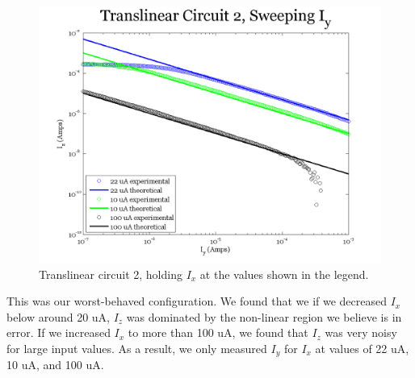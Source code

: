 \documentclass{article}
\begin{document}
\begin{figure}[H]
\begin{center}
\includegraphics[scale=.75]{exp3_sweepy.png}
\caption{Translinear circuit 2, holding $I_x$ at the values shown in the legend.}
\label{fig:tl2sweepy}
\end{center}
\end{figure}

This was our worst-behaved configuration.  We found that we if we decreased $I_x$ below around 20 uA, $I_z$ was dominated by the non-linear region we believe is in error.  If we increased $I_x$ to more than 100 uA, we found that $I_z$ was very noisy for large input values.  As a result, we only measured $I_y$ for $I_x$ at values of 22 uA, 10 uA, and 100 uA.
\end{document}
